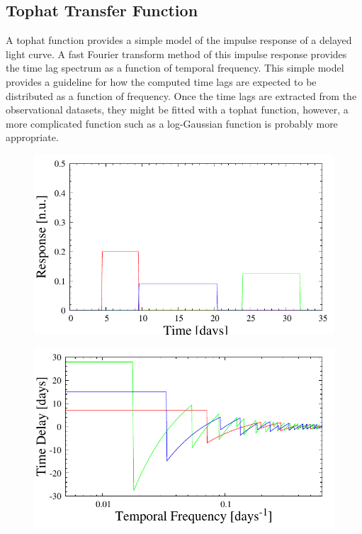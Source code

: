 \documentclass[11pt,letterpaper]{article}
\begin{document}
    \subsection{Tophat Transfer Function}

	A tophat function provides a simple model of the impulse response of a delayed light curve. A fast Fourier transform method of this impulse response provides the time lag spectrum as a function of temporal frequency. This simple model provides a guideline for how the computed time lags are expected to be distributed as a function of frequency. Once the time lags are extracted from the observational datasets, they might be fitted with a tophat function, however, a more complicated function such as a log-Gaussian function is probably more appropriate.

    \begin{figure}
        \centering
        \begin{minipage}{.475\textwidth}
            \centering
            \includegraphics[width=1\linewidth]{../img/tophat_timedomain.pdf}
            \label{fig:th_time}
        \end{minipage}
        \hfill
        \begin{minipage}{.475\textwidth}
            \centering
            \includegraphics[width=1\linewidth]{../img/tophat_freqdomain.pdf}

\end{minipage}
\end{figure}
\end{document}
